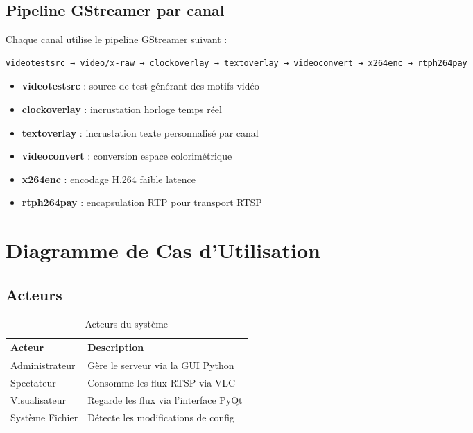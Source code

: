 \documentclass[12pt,a4paper]{report}
\begin{document}
\section{Pipeline GStreamer par canal}

Chaque canal utilise le pipeline GStreamer suivant :

\begin{lstlisting}[language=bash, caption=Pipeline GStreamer]
videotestsrc → video/x-raw → clockoverlay → textoverlay → videoconvert → x264enc → rtph264pay
\end{lstlisting}

\begin{itemize}
    \item \textbf{videotestsrc} : source de test générant des motifs vidéo
    \item \textbf{clockoverlay} : incrustation horloge temps réel
    \item \textbf{textoverlay} : incrustation texte personnalisé par canal
    \item \textbf{videoconvert} : conversion espace colorimétrique
    \item \textbf{x264enc} : encodage H.264 faible latence
    \item \textbf{rtph264pay} : encapsulation RTP pour transport RTSP
\end{itemize}

\chapter{Diagramme de Cas d'Utilisation}

\section{Acteurs}

\begin{table}[H]
    \centering
    \caption{Acteurs du système}
    \label{tab:acteurs}
    \begin{tabular}{|l|l|}
        \hline
        \textbf{Acteur} & \textbf{Description} \\
        \hline
        Administrateur & Gère le serveur via la GUI Python \\
        Spectateur & Consomme les flux RTSP via VLC \\
        Visualisateur & Regarde les flux via l'interface PyQt \\
        Système Fichier & Détecte les modifications de config \\
        \hline
    \end{tabular}
\end{table}
\end{document}
